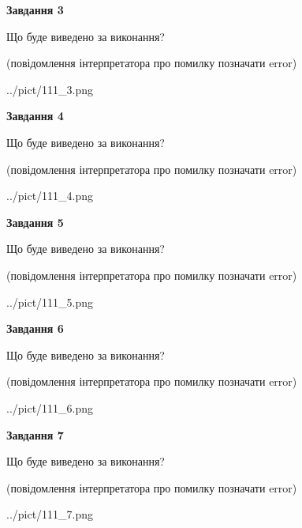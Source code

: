 \documentclass[12pt, ukrainian]{article}
\begin{document}
{\begin {large}
{\begin {center}\textbf{Завдання 3}\end {center}}\par
Що буде виведено за виконання?\par
 (повідомлення інтерпретатора про помилку позначати error)\par
\begin{center}
	{../pict/111_3.png}
\end{center}
\newpage

{\begin {center}\textbf{Завдання 4}\end {center}}\par
Що буде виведено за виконання?\par
 (повідомлення інтерпретатора про помилку позначати error)\par
\begin{center}
	{../pict/111_4.png}
\end{center}
\newpage

{\begin {center}\textbf{Завдання 5}\end {center}}\par
Що буде виведено за виконання?\par
 (повідомлення інтерпретатора про помилку позначати error)\par
\begin{center}
	{../pict/111_5.png}
\end{center}
\newpage

{\begin {center}\textbf{Завдання 6}\end {center}}\par
Що буде виведено за виконання?\par
 (повідомлення інтерпретатора про помилку позначати error)\par
\begin{center}
	{../pict/111_6.png}
\end{center}
\newpage

{\begin {center}\textbf{Завдання 7}\end {center}}\par
Що буде виведено за виконання?\par
 (повідомлення інтерпретатора про помилку позначати error)\par
\begin{center}
	{../pict/111_7.png}
\end{center}
\newpage


\end{large}}
\end{document}
